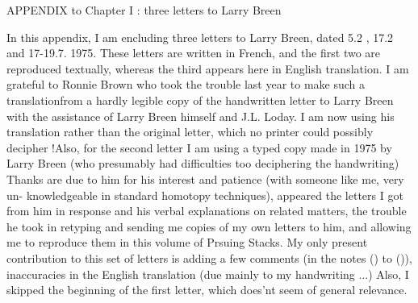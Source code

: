 
APPENDIX to Chapter I : three letters to Larry Breen

 In this appendix, I am encluding three letters to Larry Breen, dated
5.2 , 17.2 and 17-19.7. 1975. These letters are written in French, and
the first two are reproduced textually, whereas the third appears here in
English translation. I am grateful to Ronnie Brown who took the trouble
last year to make such a translation\hand{(}from a hardly legible  copy of
the handwritten letter to Larry Breen\hand{)} with the assistance of Larry Breen
himself and J.L. Loday. I am now using his translation rather than the
original letter, which no printer could possibly decipher !\hand{/}Also, for the
second letter I am using a typed copy made in 1975 by Larry Breen (who
presumably had difficulties too deciphering the handwriting) Thanks are
due to him for his interest and patience (with someone like me, very un-%
knowledgeable in standard homotopy techniques),  appeared  the
letters I got from him in response and his verbal explanations on related
matters, the trouble he took in  retyping and sending me copies of
my own letters to him, and allowing me to reproduce them in this volume
of Prsuing Stacks. My only present contribution to this set of letters is
adding a few comments (in the notes () to ()),  
inaccuracies in the English translation (due mainly to my handwriting ...)
Also, I skipped the beginning of the first letter, which does'nt seem 
 of general relevance.

